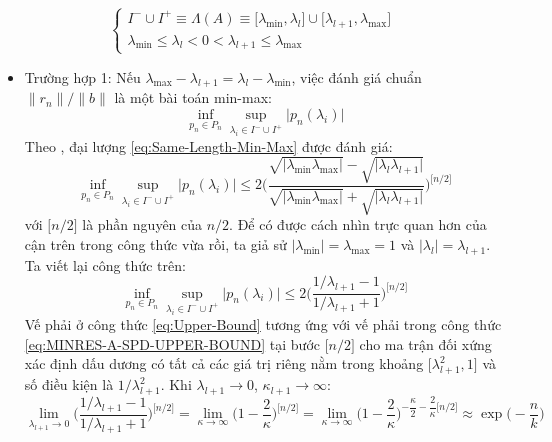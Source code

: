 \documentclass[14pt, a4paper]{article}
\numberwithin{equation}{section}
\numberwithin{algorithm}{section}
\numberwithin{figure}{section}
\numberwithin{dl}{section}
\numberwithin{md}{section}
\numberwithin{bd}{section}
\numberwithin{dn}{section}
\begin{document}
\begin{enumerate}[a)]
    \begin{equation}
        \begin{cases}
            I^- \cup I^+ \equiv \Lambda(A) \equiv \lbrack \lambda_{\min}, \lambda_l \rbrack \cup \lbrack \lambda_{l+1}, \lambda_{\max} \rbrack \\
            \lambda_{\min} \leq \lambda_l < 0 < \lambda_{l+1} \leq \lambda_{\max}
        \end{cases}
    \end{equation}
    \begin{itemize}
        \item Trường hợp 1: Nếu $\lambda_{\max} - \lambda_{l+1}=\lambda_{l} - \lambda_{\min}$, việc đánh giá chuẩn $\lVert r_n \rVert / \lVert b \rVert$ là một bài toán min-max:
        \begin{equation} \label{eq:Same-Length-Min-Max}
            \inf_{p_n \in P_n} \sup_{\lambda_i \in I^- \cup I^+} \lvert p_n(\lambda_i) \rvert
        \end{equation}
        Theo \cite{de1982extremal}, đại lượng \ref{eq:Same-Length-Min-Max} được đánh giá:
        \begin{equation} \label{eq:Same-Length-Upper-Bound}
            \inf_{p_n \in P_n} \sup_{\lambda_i \in I^- \cup I^+} \lvert p_n(\lambda_i) \rvert \leq 2 \Bigg( \dfrac{\sqrt{\lvert \lambda_{\min} \lambda_{\max} \rvert} - \sqrt{\lvert \lambda_{l} \lambda_{l+1} \rvert}}{\sqrt{\lvert \lambda_{\min} \lambda_{\max} \rvert} + \sqrt{\lvert \lambda_{l} \lambda_{l+1} \rvert}} \Bigg)^{\lbrack n/2 \rbrack}
        \end{equation}
        với $\lbrack n/2 \rbrack$ là phần nguyên của $n/2$. Để có được cách nhìn trực quan hơn của cận trên trong công thức vừa rồi, ta giả sử $\lvert \lambda_{\min} \rvert=\lambda_{\max}=1$ và $\lvert \lambda_l \rvert=\lambda_{l+1}$. Ta viết lại công thức trên:
        \begin{equation} \label{eq:Upper-Bound}
            \inf_{p_n \in P_n} \sup_{\lambda_i \in I^- \cup I^+} \lvert p_n(\lambda_i) \rvert \leq 2 \Bigg( \dfrac{1/\lambda_{l+1}-1}{1/\lambda_{l+1}+1} \Bigg)^{\lbrack n/2 \rbrack}
        \end{equation}
        Vế phải ở công thức \ref{eq:Upper-Bound} tương ứng với vế phải trong công thức \ref{eq:MINRES-A-SPD-UPPER-BOUND} tại bước $\lbrack n/2 \rbrack$ cho ma trận đối xứng xác định dấu dương có tất cả các giá trị riêng nằm trong khoảng $\lbrack \lambda_{l+1}^2, 1 \rbrack$ và số điều kiện là $1/\lambda_{l+1}^2$. Khi $\lambda_{l+1} \rightarrow 0$, $\kappa_{l+1}\rightarrow \infty$:
        \begin{equation}
                \lim_{\lambda_{l+1} \rightarrow 0} \Bigg( \dfrac{1/\lambda_{l+1}-1}{1/\lambda_{l+1}+1} \Bigg)^{\lbrack n/2 \rbrack}=\lim_{\kappa \rightarrow \infty}\Bigg( 1 - \dfrac{2}{\kappa} \Bigg)^{\lbrack n/2 \rbrack}=\lim_{\kappa \rightarrow \infty} \Bigg( 1 - \dfrac{2}{\kappa} \Bigg)^{-\dfrac{\kappa}{2}-\dfrac{2}{\kappa}\lbrack n/2 \rbrack} \approx \exp \Big( - \dfrac{n}{k} \Big)
        \end{equation}


\end{itemize}
\end{enumerate}
\end{document}
